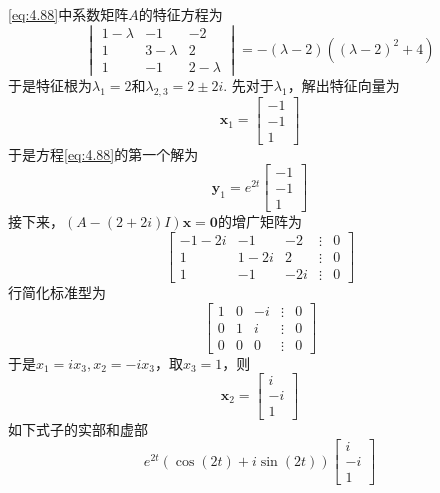 \begin{solution}
    \ref{eq:4.88}中系数矩阵$A$的特征方程为
    \[
        \begin{vmatrix}
            1-\lambda & -1        & -2        \\
            1         & 3-\lambda & 2         \\
            1         & -1        & 2-\lambda
        \end{vmatrix}=-(\lambda-2)((\lambda-2)^2+4)
    \]
    于是特征根为$\lambda_1=2$和$\lambda_{2,3}=2\pm 2i$. 先对于$\lambda_1$，解出特征向量为
    \[
        \mathbf{x}_1=\begin{bmatrix}
            -1 \\
            -1 \\
            1
        \end{bmatrix}
    \]
    于是方程\ref{eq:4.88}的第一个解为
    \[
        \mathbf{y}_1=e^{2t}\begin{bmatrix}
            -1 \\
            -1 \\
            1
        \end{bmatrix}
    \]
    接下来，$(A-(2+2i)I)\mathbf{x}=\mathbf{0}$的增广矩阵为
    \[
        \begin{bmatrix}
            -1-2i & -1   & -2  & \vdots & 0 \\
            1     & 1-2i & 2   & \vdots & 0 \\
            1     & -1   & -2i & \vdots & 0
        \end{bmatrix}
    \]
    行简化标准型为
    \[
        \begin{bmatrix}
            1 & 0 & -i & \vdots & 0 \\
            0 & 1 & i  & \vdots & 0 \\
            0 & 0 & 0  & \vdots & 0
        \end{bmatrix}
    \]
    于是$x_1=ix_3,x_2=-ix_3$，取$x_3=1$，则
    \[
        \mathbf{x}_2=\begin{bmatrix}
            i  \\
            -i \\
            1
        \end{bmatrix}
    \]
    如下式子的实部和虚部
    \[
        e^{2t}(\cos(2t)+i \sin(2t))\begin{bmatrix}
            i  \\
            -i \\
            1
        \end{bmatrix}
\]
\end{solution}
